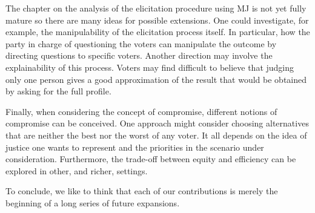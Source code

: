 The chapter on the analysis of the elicitation procedure using MJ is not yet fully mature so there are many ideas for possible extensions. One could investigate, for example, the manipulability of the elicitation process itself. In particular, how the party in charge of questioning the voters can manipulate the outcome by directing questions to specific voters. 
Another direction may involve the explainability of this process. Voters may find difficult to believe that judging only one person gives a good approximation of the result that would be obtained by asking for the full profile.

Finally, when considering the concept of compromise, different notions of compromise can be conceived. One approach might consider choosing alternatives that are neither the best nor the worst of any voter. It all depends on the idea of justice one wants to represent and the priorities in the scenario under consideration.
Furthermore, the trade-off between equity and efficiency can be explored in other, and richer, settings. 

To conclude, we like to think that each of our contributions is merely the beginning of a long series of future expansions.
